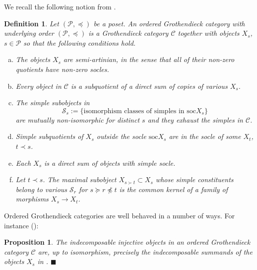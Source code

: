 \documentclass[11pt]{article}
\theoremstyle{plain}
\newtheorem{proposition}[lemma]{Proposition}
\theoremstyle{nonumberplain}
\theoremstyle{plain}
\newtheorem{definition}[lemma]{Definition}
\numberwithin{equation}{section}
\theoremstyle{nonumberplain}
\newcommand\cC{{\mathcal C}}
\newcommand\cP{{\mathcal P}}
\newcommand\cS{{\mathcal S}}
\newcommand\1{{\bf 1}}
\newcommand{\qedhere}{\mbox{}\hfill\ensuremath{\blacksquare}}
\begin{document}
We recall the following notion from \cite[Definition 2.3]{us1}.

\begin{definition}\label{def.ord-gr}
  Let $(\cP,\preceq)$ be a poset. An {\it ordered Grothendieck category} with underlying order $(\cP,\preceq)$ is a Grothendieck category $\cC$ together with objects $X_s$, $s\in \cP$ so that the following conditions hold.

\begin{enumerate}[(a)]
\item\label{item:3} The objects $X_s$ are {\it semi-artinian}, in the sense that all of their non-zero quotients have non-zero socles.
\item\label{item:5} Every object in $\cC$ is a subquotient of a direct sum of copies of various $X_s$.
\item\label{item:6} The simple subobjects in
  \begin{equation}\label{eq:14}
    \cS_s:=\{\text{isomorphism classes of simples in }\mathrm{soc}X_s\}
  \end{equation}
  are mutually non-isomorphic for distinct $s$ and they exhaust the simples in $\cC$.
\item\label{item:7} Simple subquotients of $X_s$ outside the socle $\mathrm{soc}X_s$ are in the socle of some $X_t$, $t\prec s$. 
\item\label{item:8} Each $X_s$ is a direct sum of objects with simple socle.
\item\label{item:9} Let $t\prec s$. The maximal subobject $X_{s\succ t}\subset X_{s}$ whose simple constituents belong to various $\cS_r$ for $s\succeq r\not\preceq t$ is the common kernel of a family of morphisms $X_s\to X_t$.
\end{enumerate}
\end{definition}

Ordered Grothendieck categories are well behaved in a number of ways. For instance (\cite[Corollary 2.6]{us1}):

\begin{proposition}
  The indecomposable injective objects in an ordered Grothendieck category $\cC$ are, up to isomorphism, precisely the indecomposable summands of the objects $X_s$ in .  \qedhere
\end{proposition}
\end{document}

